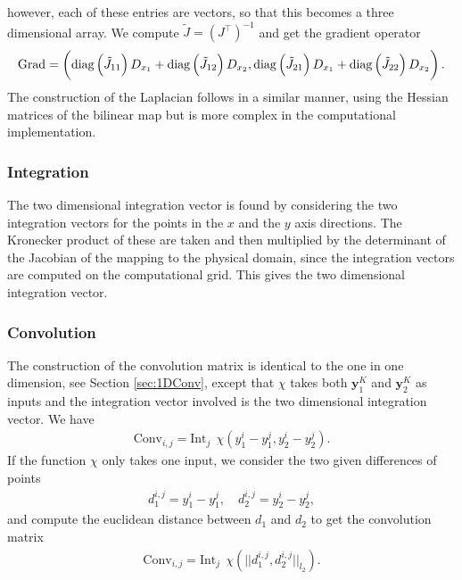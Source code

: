 however, each of these entries are  vectors, so that this becomes a three dimensional array. We compute $\tilde J = \left(J^\top\right)^{-1}$ and get the gradient operator 
\begin{align*}
	\operatorname{Grad} = \left( \text{diag}\left(\tilde J_{11}\right) D_{x_1} + \text{diag}\left(\tilde J_{12}\right) D_{x_2},\text{diag}\left(\tilde J_{21}\right) D_{x_1} + \text{diag}\left(\tilde J_{22}\right) D_{x_2}\right).
\end{align*}
The construction of the Laplacian follows in a similar manner, using the Hessian matrices of the bilinear map but is more complex in the computational implementation.


\subsubsection*{Integration}\label{sec:2DQuadInt}
The two dimensional integration vector is found by considering the two integration vectors for the points in the $x$ and the $y$ axis directions. The Kronecker product of these are taken and then multiplied by the determinant of the Jacobian of the mapping to the physical domain, since the integration vectors are computed on the computational grid. This gives the two dimensional integration vector.

\subsubsection*{Convolution}\label{sec:2DQuadConv}
The construction of the convolution matrix is identical to the one in one dimension, see Section \ref{sec:1DConv}, except that $\chi$ takes both $\mathbf{y}_1^{K}$ and $\mathbf{y}_2^{K}$ as inputs and the integration vector involved is the two dimensional integration vector.
We have
\begin{align*}
	\text{Conv}_{i,j} = \text{Int}_j \ \ \chi({y}_1^{i} - {y}_1^{j},{y}_2^{i} - {y}_2^{j}).
\end{align*}
If the function $\chi$ only takes one input, we  consider the two given differences of points 
\begin{align*}
	d_1^{i,j} = {y}_1^{i} - {y}_1^{j}, \quad
	d_2^{i,j} = {y}_2^{i} - {y}_2^{j},
\end{align*}
and compute the euclidean distance between $d_1$ and $d_2$ to get the convolution matrix
\begin{align*}
	\text{Conv}_{i,j} = \text{Int}_j \ \ \chi(||d_1^{i,j}, d_2^{i,j}||_{l_2}).
\end{align*}

